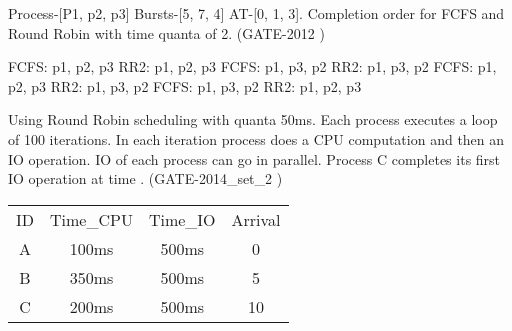 
\begin{minipage}{\linewidth}

  \question Process-[P1, p2, p3] Bursts-[5, 7, 4] AT-[0, 1, 3].
            Completion order for FCFS and Round Robin with time quanta of 2. (GATE-2012 )

  \begin{choices}
    \choice FCFS: p1, p2, p3  \qquad   RR2: p1, p2, p3
    \choice FCFS: p1, p3, p2  \qquad   RR2: p1, p3, p2
    \choice FCFS: p1, p2, p3  \qquad   RR2: p1, p3, p2
    \choice FCFS: p1, p3, p2  \qquad   RR2: p1, p2, p3
  \end{choices}

  \end{minipage}

\vspace{0.08in}


\begin{minipage}{\linewidth}

  \question  Using Round Robin scheduling with quanta 50ms. Each process executes a loop of 100 iterations.
             In each iteration process does a CPU computation and then an IO operation.
             IO of each process can go in parallel. Process C completes its first IO operation at time \fillin[time]. (GATE-2014\_set\_2 )
      \begin{center}
      \begin{tabular}{ c c c c }
          ID & Time\_CPU & Time\_IO  & Arrival\\
          A & 100ms & 500ms & 0 \\
          B & 350ms & 500ms & 5 \\
          C & 200ms & 500ms & 10 \\
      \end{tabular}
    \end{center}

  \end{minipage}

\vspace{0.08in}




